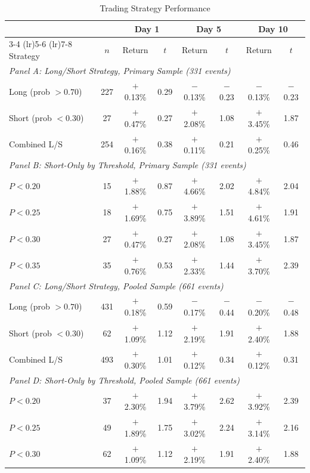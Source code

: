 \documentclass[11pt]{article}
\begin{document}
\begin{table}[htbp]
\centering
\begin{threeparttable}
\caption{Trading Strategy Performance}
\label{tab:strategies}
\begin{tabular}{lccccccc}
\toprule
& & \multicolumn{2}{c}{Day 1} & \multicolumn{2}{c}{Day 5} & \multicolumn{2}{c}{Day 10} \\
\cmidrule(lr){3-4} \cmidrule(lr){5-6} \cmidrule(lr){7-8}
Strategy & $n$ & Return & $t$ & Return & $t$ & Return & $t$ \\
\midrule
\multicolumn{8}{l}{\textit{Panel A: Long/Short Strategy, Primary Sample (331 events)}} \\
Long (prob $> 0.70$) & 227 & $+$0.13\% & 0.29 & $-$0.13\% & $-$0.23 & $-$0.13\% & $-$0.23 \\
Short (prob $< 0.30$) & 27 & $+$0.47\% & 0.27 & $+$2.08\% & 1.08 & $+$3.45\% & 1.87 \\
Combined L/S & 254 & $+$0.16\% & 0.38 & $+$0.11\% & 0.21 & $+$0.25\% & 0.46 \\
\midrule
\multicolumn{8}{l}{\textit{Panel B: Short-Only by Threshold, Primary Sample (331 events)}} \\
$P < 0.20$ & 15 & $+$1.88\% & 0.87 & $+$4.66\% & 2.02 & $+$4.84\% & 2.04 \\
$P < 0.25$ & 18 & $+$1.69\% & 0.75 & $+$3.89\% & 1.51 & $+$4.61\% & 1.91 \\
$P < 0.30$ & 27 & $+$0.47\% & 0.27 & $+$2.08\% & 1.08 & $+$3.45\% & 1.87 \\
$P < 0.35$ & 35 & $+$0.76\% & 0.53 & $+$2.33\% & 1.44 & $+$3.70\% & 2.39 \\
\midrule
\multicolumn{8}{l}{\textit{Panel C: Long/Short Strategy, Pooled Sample (661 events)}} \\
Long (prob $> 0.70$) & 431 & $+$0.18\% & 0.59 & $-$0.17\% & $-$0.44 & $-$0.20\% & $-$0.48 \\
Short (prob $< 0.30$) & 62 & $+$1.09\% & 1.12 & $+$2.19\% & 1.91 & $+$2.40\% & 1.88 \\
Combined L/S & 493 & $+$0.30\% & 1.01 & $+$0.12\% & 0.34 & $+$0.12\% & 0.31 \\
\midrule
\multicolumn{8}{l}{\textit{Panel D: Short-Only by Threshold, Pooled Sample (661 events)}} \\
$P < 0.20$ & 37 & $+$2.30\% & 1.94 & $+$3.79\% & 2.62 & $+$3.92\% & 2.39 \\
$P < 0.25$ & 49 & $+$1.89\% & 1.75 & $+$3.02\% & 2.24 & $+$3.14\% & 2.16 \\
$P < 0.30$ & 62 & $+$1.09\% & 1.12 & $+$2.19\% & 1.91 & $+$2.40\% & 1.88 \\

\end{tabular}
\end{threeparttable}
\end{table}
\end{document}
